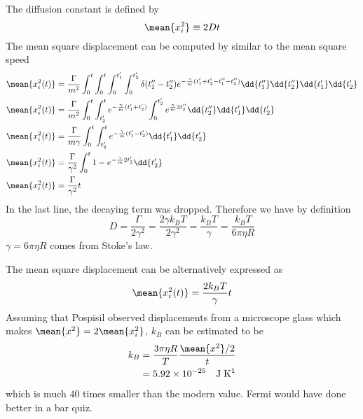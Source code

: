\documentclass[12pt]{article}
\begin{document}
    The diffusion constant is defined by \[
        \mean{x_i^2} \equiv 2Dt
    \]
    The mean square displacement can be computed by similar to the mean square speed \begin{align*}
        \mean{x_i^2(t)} &= \frac{\Gamma }{m^2} \int_0^t \int_0^t \int_0^{t_1'} \int_0^{t_2'} \delta(t_1'' - t_2'') e^{ - \frac{\gamma}{m}(t_1' + t_2' - t_1'' - t_2'')} \dd{t_1''}\dd{t_2''}\dd{t_1'}\dd{t_2'}\\
        \mean{x_i^2(t)} &= \frac{\Gamma }{m^2} \int_0^t \int_{t_2'}^t   e^{ - \frac{\gamma}{m}(t_1' + t_2')}\int_0^{t_2'} e^{\frac{\gamma}{m} 2t_2''} \dd{t_2''}\dd{t_1'}\dd{t_2'}\\
        \mean{x_i^2(t)} &= \frac{\Gamma }{m \gamma} \int_0^t \int_{t_2'}^t   e^{ - \frac{\gamma}{m}(t_1' - t_2')}  \dd{t_1'}\dd{t_2'}\\
        \mean{x_i^2(t)} &= \frac{\Gamma }{\gamma^2} \int_0^t 1 - e^{ - \frac{\gamma}{m}2t_2'}  \dd{t_2'}\\
        \mean{x_i^2(t)} &= \frac{\Gamma }{\gamma^2} t
    \end{align*}
    In the last line, the decaying term was dropped. Therefore we have by definition \[
        D = \frac{\Gamma}{2\gamma^2} = \frac{2\gamma k_BT}{2 \gamma^2} = \frac{k_B T}{\gamma} =\frac{k_B T}{6\pi \eta R} 
    \]
    \(\gamma = 6\pi \eta R\) comes from Stoke's law.

    The mean square displacement can be alternatively expressed as \[
        \mean{x_i^2(t)} = \frac{2 k_BT}{\gamma} t
    \]
    Assuming that Pospisil observed displacements from a microscope glass which makes \(\mean{x^2} = 2\mean{x_i^2}\), \(k_B\) can be estimated to be\begin{align*}
        k_B &= \frac{3\pi \eta R}{T} \frac{\mean{x^2}  /2}{t} \\
        &= 5.92 \times 10^{ - 25} \quad\mathrm{J\;K^{ 1}}
    \end{align*}
    which is much \(40\) times smaller than the modern value. Fermi would have done better in a bar quiz.
\end{document}
